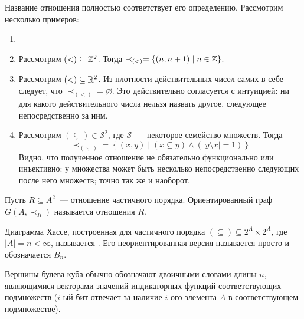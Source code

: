 Название отношения полностью соответствует его определению.
Рассмотрим несколько примеров:

\begin{example}
    \begin{enumerate}
        \item[]
        \item
            Рассмотрим $ (<) \subseteq \mathbb{Z}^2 $.
            Тогда $ \prec_{(<)} = \left\{ (n, n+1) \mid n \in \mathbb{Z} \right\} $.
        \item
            Рассмотрим $ (<) \subseteq \mathbb{R}^2 $.
            Из плотности действительных чисел самих в себе следует, что $ \prec_{(<)} = \varnothing $.
            Это действительно согласуется с интуицией: ни для какого действительного числа нельзя назвать другое,
            следующее непосредственно за ним.
        \item
            Рассмотрим $ (\subsetneq) \in \mathcal{S}^2 $, где $ \mathcal{S} $~--- некоторое семейство множеств.
            Тогда
            \[
                \prec_{(\subsetneq)} = \left\{ (x, y) \mid (x \subseteq y) \wedge (|y \setminus x| = 1) \right\}
            \]
            Видно, что полученное отношение не обязательно функционально или инъективно:
            у множества может быть несколько непосредственно следующих после него множеств;
            точно так же и наоборот.
    \end{enumerate}
\end{example}

\begin{definition}
    Пусть $ R \subseteq A^2 $~--- отношение частичного порядка.
    Ориентированный граф $ G(A, \prec_R) $ называется  отношения $ R $.
\end{definition}

\begin{definition}
    Диаграмма Хассе, построенная для частичного порядка $ (\subseteq) \subseteq 2^A \times 2^A $, где $ |A| = n < \infty $,
    называется .
    Его неориентированная версия называется просто  и обозначается $ B_n $.
\end{definition}

\begin{remark}
    Вершины булева куба обычно обозначают двоичными словами длины $ n $,
    являющимися векторами значений индикаторных функций соответствующих подмножеств
    ($ i $-ый бит отвечает за наличие $ i $-ого элемента $ A $ в соответствующем подмножестве).
\end{remark}

